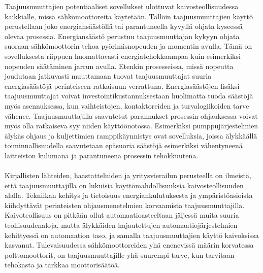 \documentclass[finnish,12pt,a4paper,pdftex,elec,utf8]{aaltothesis}
\begin{document}
Taajuusmuuttajien potentiaaliset sovellukset ulottuvat kaivosteollisuudessa kaikkialle, missä sähkömoottoreita käytetään. Tällöin taajuusmuuttajien käyttö perustellaan joko energiansäästöllä tai parantuneella kyvyllä ohjata kyseessä olevaa prosessia. Energiansäästö perustuu taajuusmuuttajan kykyyn ohjata suoraan sähkömoottorin tehoa pyörimisnopeuden ja momentin avulla. Tämä on sovelluksesta riippuen huomattavasti energiatehokkaampaa kuin esimerkiksi nopeuden säätäminen jarrun avulla. Etenkin prosesseissa, missä nopeutta joudutaan jatkuvasti muuttamaan tuovat taajuusmuuttajat suuria energiasäästöjä perinteiseen ratkaisuun verrattuna. Energiasäästöjen lisäksi taajuusmuuttajat voivat investointikustannuksestaan huolimatta tuoda säästöjä myös asennuksessa, kun vaihteistojen, kontaktoreiden ja turvalogiikoiden tarve vähenee. Taajuusmuuttajilla saavutetut parannukset prosessin ohjauksessa voivat myös olla ratkaiseva syy niiden käyttöönotossa. Esimerkiksi pumppujärjestelmien älykäs ohjaus ja kuljettimien ramppikäynnistys ovat sovelluksia, joissa älykkäällä toiminnallisuudella saavutetaan epäsuoria säästöjä esimerkiksi vähentyneenä laitteiston kulumana ja parantuneena prosessin tehokkuutena.
\\\\
Kirjallisten lähteiden, haastatteluiden ja yritysvierailun perusteella on ilmeistä, että taajuusmuuttajilla on lukuisia käyttömahdollisuuksia kaivosteollisuuden alalla. Tekniikan kehitys ja tietoisuus energiankulutuksesta ja ympäristöasioista kiihdyttävät perinteisten ohjausmenetelmien korvaamista  taajuusmuuttajilla. Kaivoteollisuus on pitkään ollut automaatioasteeltaan jäljessä muita suuria teollisuudenaloja, mutta älykkäiden hajautettujen automaatiojärjestelmien kehittyessä on automaation taso, ja samalla taajuusmuuttajien käyttö kaivoksissa kasvanut. Tulevaisuudessa sähkömoottoreiden yhä enenevissä määrin korvatessa polttomoottorit, on taajuusmuuttajille yhä suurempi tarve, kun tarvitaan tehokasta ja tarkkaa moottorisäätöä.




\clearpage
\end{document}
